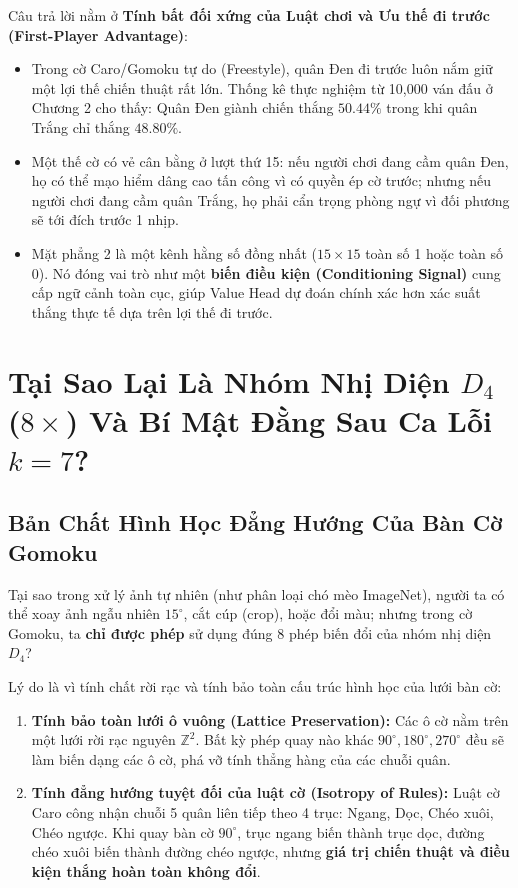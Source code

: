 \documentclass[11pt,a4paper]{report}
\begin{document}
Câu trả lời nằm ở \textbf{Tính bất đối xứng của Luật chơi và Ưu thế đi trước (First-Player Advantage)}:
\begin{itemize}
    \item Trong cờ Caro/Gomoku tự do (Freestyle), quân Đen đi trước luôn nắm giữ một lợi thế chiến thuật rất lớn. Thống kê thực nghiệm từ 10,000 ván đấu ở Chương 2 cho thấy: Quân Đen giành chiến thắng $50.44\%$ trong khi quân Trắng chỉ thắng $48.80\%$.
    \item Một thế cờ có vẻ cân bằng ở lượt thứ 15: nếu người chơi đang cầm quân Đen, họ có thể mạo hiểm dâng cao tấn công vì có quyền ép cờ trước; nhưng nếu người chơi đang cầm quân Trắng, họ phải cẩn trọng phòng ngự vì đối phương sẽ tới đích trước 1 nhịp.
    \item Mặt phẳng 2 là một kênh hằng số đồng nhất ($15 \times 15$ toàn số 1 hoặc toàn số 0). Nó đóng vai trò như một \textbf{biến điều kiện (Conditioning Signal)} cung cấp ngữ cảnh toàn cục, giúp Value Head dự đoán chính xác hơn xác suất thắng thực tế dựa trên lợi thế đi trước.
\end{itemize}

\chapter{Tại Sao Lại Là Nhóm Nhị Diện $D_4$ ($8\times$) Và Bí Mật Đằng Sau Ca Lỗi $k=7$?}

\section{Bản Chất Hình Học Đẳng Hướng Của Bàn Cờ Gomoku}

Tại sao trong xử lý ảnh tự nhiên (như phân loại chó mèo ImageNet), người ta có thể xoay ảnh ngẫu nhiên $15^\circ$, cắt cúp (crop), hoặc đổi màu; nhưng trong cờ Gomoku, ta \textbf{chỉ được phép} sử dụng đúng 8 phép biến đổi của nhóm nhị diện $D_4$?

Lý do là vì tính chất rời rạc và tính bảo toàn cấu trúc hình học của lưới bàn cờ:
\begin{enumerate}
    \item \textbf{Tính bảo toàn lưới ô vuông (Lattice Preservation):} Các ô cờ nằm trên một lưới rời rạc nguyên $\mathbb{Z}^2$. Bất kỳ phép quay nào khác $90^\circ, 180^\circ, 270^\circ$ đều sẽ làm biến dạng các ô cờ, phá vỡ tính thẳng hàng của các chuỗi quân.
    \item \textbf{Tính đẳng hướng tuyệt đối của luật cờ (Isotropy of Rules):} Luật cờ Caro công nhận chuỗi 5 quân liên tiếp theo 4 trục: Ngang, Dọc, Chéo xuôi, Chéo ngược. Khi quay bàn cờ $90^\circ$, trục ngang biến thành trục dọc, đường chéo xuôi biến thành đường chéo ngược, nhưng \textbf{giá trị chiến thuật và điều kiện thắng hoàn toàn không đổi}.
\end{enumerate}
\end{document}

